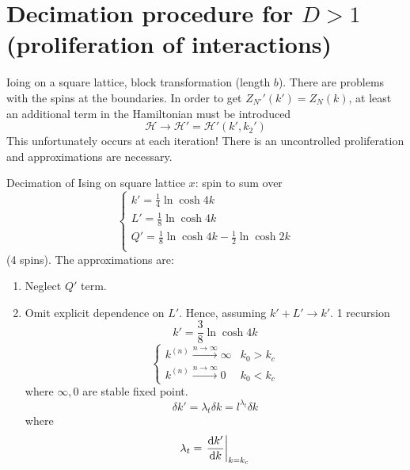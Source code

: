 \documentclass[../main/main.tex]{subfiles}
\begin{document}
\section{Decimation procedure for \( D>1 \) (proliferation of interactions)}
Ioing on a square lattice, block transformation (length \( b \)). There are problems with the spins at the boundaries.
In order to get \( Z_{N'}' (k') = Z_N (k) \), at least an additional term in the Hamiltonian must be introduced
\begin{equation}
  \mathcal{H} \rightarrow \mathcal{H}' = \mathcal{H}' (k',k_2')
\end{equation}
This unfortunately occurs at each iteration! There is an uncontrolled proliferation and approximations are necessary.
\begin{example}{Decimation of Ising on square lattice}{}
  \( x \): spin to sum over
\begin{equation}
  \begin{cases}
   k' = \frac{1}{4} \ln{\cosh 4 k} \\
   L' = \frac{1}{8} \ln{\cosh 4 k} \\
   Q' = \frac{1}{8} \ln{\cosh 4 k} - \frac{1}{2} \ln{\cosh 2 k}\\
  \end{cases}
\end{equation}
(4 spins). The approximations are:
\begin{enumerate}
\item Neglect \( Q' \) term.
\item Omit explicit dependence on \( L' \). Hence, assuming \( k'+L' \rightarrow k' \). 1 recursion
\begin{equation}
  k' = \frac{3}{8} \ln{\cosh 4 k}
\end{equation}
\begin{equation}
  \begin{cases}
   k^{(n)} \overset{n \rightarrow \infty }{\longrightarrow} \infty  & k_0 > k_c \\
   k^{(n)} \overset{n \rightarrow \infty }{\longrightarrow} 0  & k_0 < k_c
  \end{cases}
\end{equation}
where \( \infty ,0 \) are stable fixed point.
\begin{equation}
  \delta k' = \lambda _t \delta k = l^{\lambda _t} \delta k
\end{equation}
where
\begin{equation}
  \lambda _t = \eval{\dv{k'}{k} }_{k=k_c}
\end{equation}

\end{enumerate}
\end{example}
\end{document}
